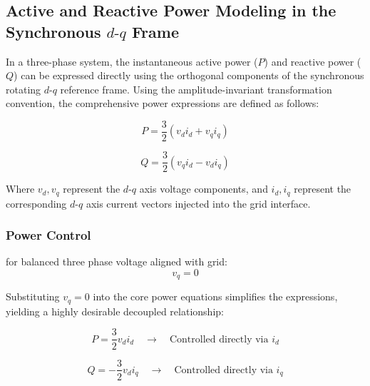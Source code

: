 
\subsection{Active and Reactive Power Modeling in the Synchronous $d\text{-}q$ Frame}

In a three-phase system, the instantaneous active power ($P$) and reactive power ($Q$) can be expressed directly using the orthogonal components of the synchronous rotating $d\text{-}q$ reference frame. Using the amplitude-invariant transformation convention, the comprehensive power expressions are defined as follows:

\begin{equation}
    P = \frac{3}{2} \left( v_d i_d + v_q i_q \right)
\end{equation}

\begin{equation}
    Q = \frac{3}{2} \left( v_q i_d - v_d i_q \right)
\end{equation}

Where $v_d, v_q$ represent the $d\text{-}q$ axis voltage components, and $i_d, i_q$ represent the corresponding $d\text{-}q$ axis current vectors injected into the grid interface.
\newpage
\subsubsection{ Power Control}

for balanced three phase voltage aligned with grid:
\begin{equation}
    v_q = 0
\end{equation}

Substituting $v_q = 0$ into the core power equations simplifies the expressions, yielding a highly desirable decoupled relationship:

\begin{equation}
    P = \frac{3}{2} v_d i_d \quad \longrightarrow \quad \text{Controlled directly via } i_d
\end{equation}

\begin{equation}
    Q = -\frac{3}{2} v_d i_q \quad \longrightarrow \quad \text{Controlled directly via } i_q
\end{equation}

